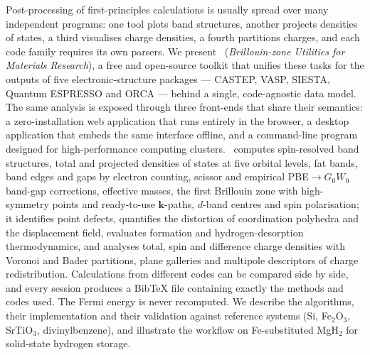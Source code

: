 Post-processing of first-principles calculations is usually spread over many independent programs: one tool plots band structures, another projects densities of states, a third visualises charge densities, a fourth partitions charges, and each code family requires its own parsers. We present \BMR\ (\emph{Brillouin-zone Utilities for Materials Research}), a free and open-source toolkit that unifies these tasks for the outputs of five electronic-structure packages — CASTEP, VASP, SIESTA, Quantum ESPRESSO and ORCA — behind a single, code-agnostic data model. The same analysis is exposed through three front-ends that share their semantics: a zero-installation web application that runs entirely in the browser, a desktop application that embeds the same interface offline, and a command-line program designed for high-performance computing clusters. \BMR\ computes spin-resolved band structures, total and projected densities of states at five orbital levels, fat bands, band edges and gaps by electron counting, scissor and empirical PBE$\to G_0W_0$ band-gap corrections, effective masses, the first Brillouin zone with high-symmetry points and ready-to-use $\bm k$-paths, $d$-band centres and spin polarisation; it identifies point defects, quantifies the distortion of coordination polyhedra and the displacement field, evaluates formation and hydrogen-desorption thermodynamics, and analyses total, spin and difference charge densities with Voronoi and Bader partitions, plane galleries and multipole descriptors of charge redistribution. Calculations from different codes can be compared side by side, and every session produces a BibTeX file containing exactly the methods and codes used. The Fermi energy is never recomputed. We describe the algorithms, their implementation and their validation against reference systems (Si, Fe$_2$O$_3$, SrTiO$_3$, divinylbenzene), and illustrate the workflow on Fe-substituted MgH$_2$ for solid-state hydrogen storage.
